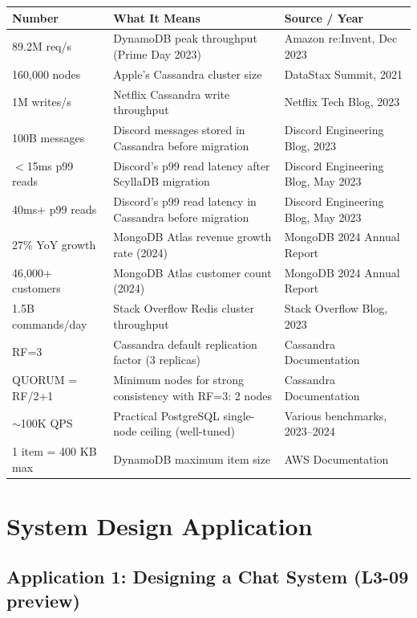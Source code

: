 \documentclass[11pt,a4paper]{article}
\begin{document}
\begin{center}
\renewcommand{\arraystretch}{1.4}
\begin{tabular}{p{5.5cm}p{5.5cm}p{3.5cm}}
\toprule
\textbf{Number} & \textbf{What It Means} & \textbf{Source / Year} \\
\midrule
89.2M req/s & DynamoDB peak throughput (Prime Day 2023) & Amazon re:Invent, Dec 2023 \\
160,000 nodes & Apple's Cassandra cluster size & DataStax Summit, 2021 \\
1M writes/s & Netflix Cassandra write throughput & Netflix Tech Blog, 2023 \\
100B messages & Discord messages stored in Cassandra before migration & Discord Engineering Blog, 2023 \\
$<$15ms p99 reads & Discord's p99 read latency after ScyllaDB migration & Discord Engineering Blog, May 2023 \\
40ms+ p99 reads & Discord's p99 read latency in Cassandra before migration & Discord Engineering Blog, May 2023 \\
27\% YoY growth & MongoDB Atlas revenue growth rate (2024) & MongoDB 2024 Annual Report \\
46,000+ customers & MongoDB Atlas customer count (2024) & MongoDB 2024 Annual Report \\
1.5B commands/day & Stack Overflow Redis cluster throughput & Stack Overflow Blog, 2023 \\
RF=3 & Cassandra default replication factor (3 replicas) & Cassandra Documentation \\
QUORUM = RF/2+1 & Minimum nodes for strong consistency with RF=3: 2 nodes & Cassandra Documentation \\
$\sim$100K QPS & Practical PostgreSQL single-node ceiling (well-tuned) & Various benchmarks, 2023--2024 \\
1 item = 400 KB max & DynamoDB maximum item size & AWS Documentation \\
\bottomrule
\end{tabular}
\end{center}

\section{System Design Application}

\subsection{Application 1: Designing a Chat System (L3-09 preview)}
\end{document}
